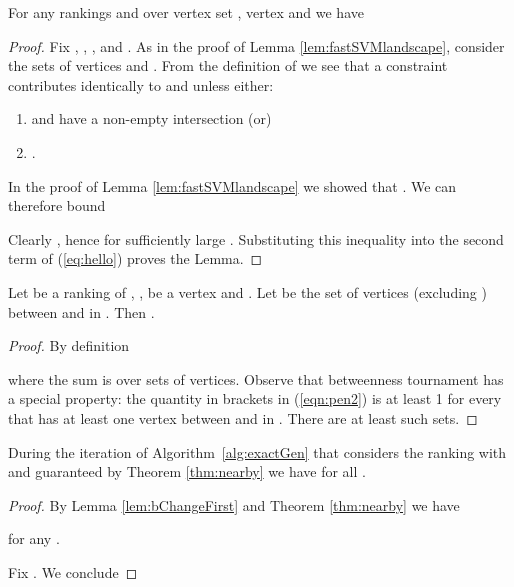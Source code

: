 \documentclass[envcountsame,oribibl]{llncs}
\begin{document}
\begin{lemma}\label{lem:bChangeFirst}
For any rankings  and  over vertex set , vertex  and  we have

\end{lemma}

\begin{proof}
Fix , , ,  and . 
As in the proof of Lemma \ref{lem:fastSVMlandscape}, consider the sets of vertices  and .
From the definition of  we see that a constraint  contributes identically to  and  unless either:
\begin{enumerate}
\item  and  have a non-empty intersection (or)
\item .
\end{enumerate}

In the proof of Lemma \ref{lem:fastSVMlandscape} we showed that .
We can therefore bound

Clearly , hence  for sufficiently large .  Substituting this inequality into the second term of (\ref{eq:hello}) proves the Lemma.
\end{proof}


\begin{lemma}\label{lem:fragile} Let  be a ranking of , ,  be a vertex and .
Let  be the set of vertices (excluding ) between  and  in . 
Then
. 
\end{lemma}

\begin{proof}
By definition

where the sum is over sets  of  vertices. Observe that betweenness tournament has a special property: the quantity in brackets in (\ref{eqn:pen2}) is at least 1 for every  that has at least one vertex between  and  in . There are at least  such sets.
\end{proof}

\begin{lemma}\label{lem:feCloseGen}
During the iteration of Algorithm~\ref{alg:exactGen} that considers the ranking with  and  guaranteed by Theorem \ref{thm:nearby} we have   for all .
\end{lemma}
\begin{proof}
By Lemma \ref{lem:bChangeFirst} and Theorem \ref{thm:nearby} we have 

for any .

Fix . We conclude

\end{proof}
\end{document}

